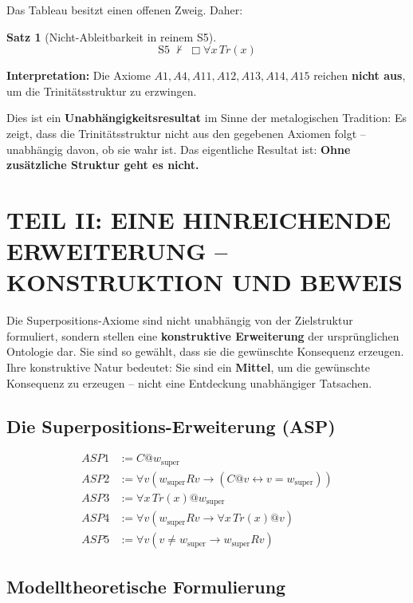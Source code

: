 \documentclass[
]{article}
\newtheorem{theorem}{Satz}
\begin{document}
Das Tableau besitzt einen offenen Zweig. Daher:

\begin{theorem}[Nicht-Ableitbarkeit in reinem S5]
\[
\boxed{
\text{S5} \;\not\vdash\; \Box\forall x\,Tr(x)
}
\]
\end{theorem}

\textbf{Interpretation:} Die Axiome \(A1, A4, A11, A12, A13, A14, A15\) reichen \textbf{nicht aus}, um die Trinitätsstruktur zu erzwingen.

Dies ist ein \textbf{Unabhängigkeitsresultat} im Sinne der metalogischen Tradition: Es zeigt, dass die Trinitätsstruktur nicht aus den gegebenen Axiomen folgt – unabhängig davon, ob sie wahr ist. Das eigentliche Resultat ist: \textbf{Ohne zusätzliche Struktur geht es nicht.}

\section{TEIL II: EINE HINREICHENDE ERWEITERUNG – KONSTRUKTION UND BEWEIS}

Die Superpositions-Axiome sind nicht unabhängig von der Zielstruktur formuliert, sondern stellen eine \textbf{konstruktive Erweiterung} der ursprünglichen Ontologie dar. Sie sind so gewählt, dass sie die gewünschte Konsequenz erzeugen. Ihre konstruktive Natur bedeutet: Sie sind ein \textbf{Mittel}, um die gewünschte Konsequenz zu erzeugen – nicht eine Entdeckung unabhängiger Tatsachen.

\subsection{Die Superpositions-Erweiterung (ASP)}

\[
\begin{aligned}
ASP1 &:= C @ w_{\text{super}} \\
ASP2 &:= \forall v (w_{\text{super}} R v \rightarrow (C @ v \leftrightarrow v = w_{\text{super}})) \\
ASP3 &:= \forall x\,Tr(x) @ w_{\text{super}} \\
ASP4 &:= \forall v (w_{\text{super}} R v \rightarrow \forall x\,Tr(x) @ v) \\
ASP5 &:= \forall v (v \neq w_{\text{super}} \rightarrow w_{\text{super}} R v)
\end{aligned}
\]

\subsection{Modelltheoretische Formulierung}
\end{document}
